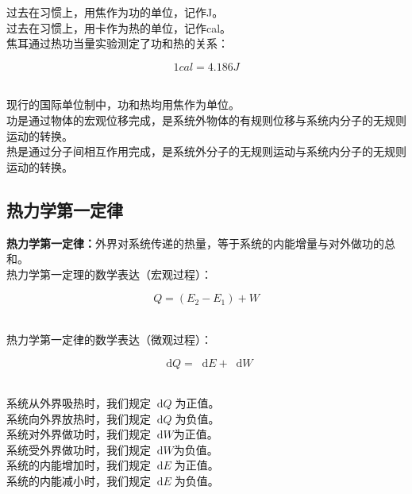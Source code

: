 \documentclass[UTF8]{ctexart}
\newcommand*{\dif}{\mathop{}\!\mathrm{d}}
\begin{document}
\newpage

    过去在习惯上，用焦作为功的单位，记作\si{J}。\\[3mm]
    过去在习惯上，用卡作为热的单位，记作\si{cal}。\\[3mm]
    焦耳通过热功当量实验测定了功和热的关系：
    \begin{large}
        \begin{equation*}
            1\si{cal}=4.186\si{J}
        \end{equation*}
    \end{large}\\
    现行的国际单位制中，功和热均用焦作为单位。\\[3mm]
    功是通过物体的宏观位移完成，是系统外物体的有规则位移与系统内分子的无规则运动的转换。\\[3mm]
    热是通过分子间相互作用完成，是系统外分子的无规则运动与系统内分子的无规则运动的转换。\\

\subsection{热力学第一定律}
    \textbf{热力学第一定律：}外界对系统传递的热量，等于系统的内能增量与对外做功的总和。\\[3mm]
    热力学第一定理的数学表达（宏观过程）：
    \begin{large}
        \begin{equation*}
            Q=(E_2-E_1)+W
        \end{equation*}
    \end{large}\\
    热力学第一定律的数学表达（微观过程）：
    \begin{large}
        \begin{equation*}
            \dif Q=\dif E+\dif W
        \end{equation*}
    \end{large}\\
    系统从外界吸热时，我们规定$\dif Q\;$为正值。\\[3mm]
    系统向外界放热时，我们规定$\dif Q\;$为负值。\\[3mm]
    系统对外界做功时，我们规定$\dif W$为正值。\\[3mm]
    系统受外界做功时，我们规定$\dif W$为负值。\\[3mm]
    系统的内能增加时，我们规定$\dif E\;$为正值。\\[3mm]
    系统的内能减小时，我们规定$\dif E\;$为负值。
\end{document}
